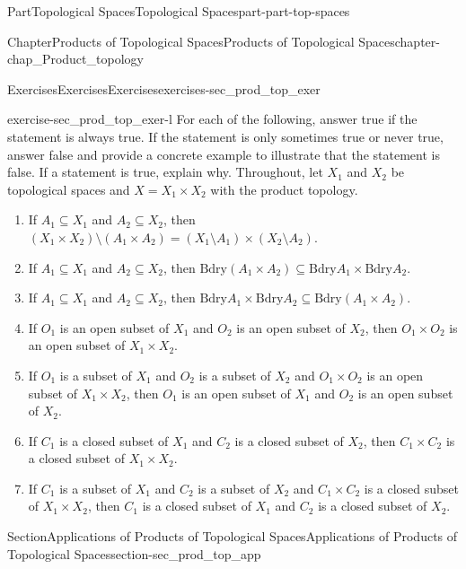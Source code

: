 \documentclass[oneside,10pt,]{book}
\numberwithin{equation}{chapter}
\newcommand{\Bdry}{\text{Bdry}}
\begin{document}
\begin{partptx}{Part}{Topological Spaces}{}{Topological Spaces}{}{}{part-part-top-spaces}
\begin{chapterptx}{Chapter}{Products of Topological Spaces}{}{Products of Topological Spaces}{}{}{chapter-chap_Product_topology}
\begin{exercises-section}{Exercises}{Exercises}{}{Exercises}{}{}{exercises-sec_prod_top_exer}
\begin{divisionexercise}{12}{}{}{exercise-sec_prod_top_exer-l}
For each of the following, answer true if the statement is always true. If the statement is only sometimes true or never true, answer false and provide a concrete example to illustrate that the statement is false. If a statement is true, explain why. Throughout, let \(X_1\) and \(X_2\) be topological spaces and \(X = X_1 \times X_2\) with the product topology.%
\begin{enumerate}[font=\bfseries,label=(\alph*),ref=\alph*]%
\item{}If \(A_1 \subseteq X_1\) and \(A_2 \subseteq X_2\), then \((X_1 \times X_2) \setminus (A_1 \times A_2) = (X_1 \setminus A_1) \times (X_2 \setminus A_2)\).%
\item{}If \(A_1 \subseteq X_1\) and \(A_2 \subseteq X_2\), then \(\Bdry(A_1 \times A_2) \subseteq \Bdry{A_1} \times \Bdry{A_2}\).%
\item{}If \(A_1 \subseteq X_1\) and \(A_2 \subseteq X_2\), then \(\Bdry{A_1} \times \Bdry{A_2} \subseteq \Bdry(A_1 \times A_2)\).%
\item{}If \(O_1\) is an open subset of \(X_1\) and \(O_2\) is an open subset of \(X_2\), then \(O_1 \times O_2\) is an open subset of \(X_1 \times X_2\).%
\item{}If \(O_1\) is a subset of \(X_1\) and \(O_2\) is a subset of \(X_2\) and \(O_1 \times O_2\) is an open subset of \(X_1 \times X_2\), then \(O_1\) is an open subset of \(X_1\) and \(O_2\) is an open subset of \(X_2\).%
\item{}If \(C_1\) is a closed subset of \(X_1\) and \(C_2\) is a closed subset of \(X_2\), then \(C_1 \times C_2\) is a closed subset of \(X_1 \times X_2\).%
\item{}If \(C_1\) is a subset of \(X_1\) and \(C_2\) is a subset of \(X_2\) and \(C_1 \times C_2\) is a closed subset of \(X_1 \times X_2\), then \(C_1\) is a closed subset of \(X_1\) and \(C_2\) is a closed subset of \(X_2\).%
\end{enumerate}%
\end{divisionexercise}%
\end{exercises-section}
%
%
\typeout{************************************************}
\typeout{************************************************}
%
\begin{sectionptx}{Section}{Applications of Products of Topological Spaces}{}{Applications of Products of Topological Spaces}{}{}{section-sec_prod_top_app}

\end{sectionptx}
\end{chapterptx}
\end{partptx}
\end{document}
